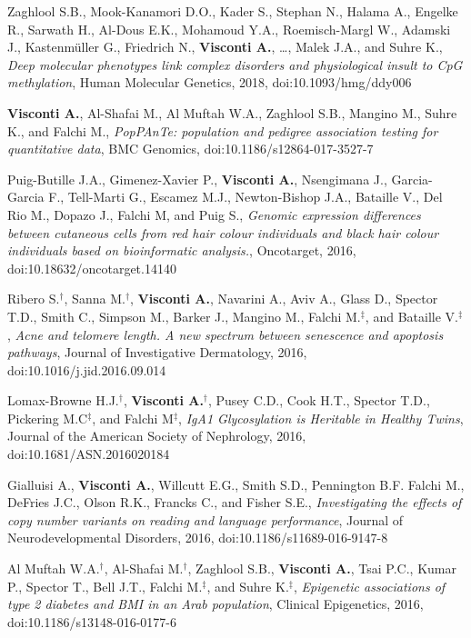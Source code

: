 {\begin{itemize}
		 Zaghlool S.B., Mook-Kanamori D.O., Kader S., Stephan N., Halama A., Engelke R., Sarwath H., Al-Dous E.K., Mohamoud Y.A., Roemisch-Margl W., Adamski J., Kastenmüller G., Friedrich N., \textbf{Visconti A.}, \dots, Malek J.A., and Suhre K., \emph{Deep molecular phenotypes link complex disorders and physiological insult to CpG methylation}, Human Molecular Genetics, 2018, doi:10.1093/hmg/ddy006
				
		 \textbf{Visconti A.}, Al-Shafai M.,  Al Muftah W.A.,  Zaghlool S.B., Mangino M., Suhre K., and Falchi M., \emph{PopPAnTe: population and pedigree association testing for quantitative data}, BMC Genomics, doi:10.1186/s12864-017-3527-7	
				
		 Puig-Butille J.A., Gimenez-Xavier P., \textbf{Visconti A.}, Nsengimana J., Garcia-Garcia F., Tell-Marti G., Escamez M.J., Newton-Bishop J.A., Bataille V., Del Rio M., Dopazo J., Falchi M, and Puig S., \emph{Genomic expression differences between cutaneous cells from red hair colour individuals and black hair colour individuals based on bioinformatic analysis.}, Oncotarget, 2016, doi:10.18632/oncotarget.14140

		 Ribero S.$^{\textbf{$\dag $}}$, Sanna M.$^{\textbf{$\dag $}}$, \textbf{Visconti A.}, Navarini A., Aviv A., Glass D., Spector T.D., Smith C., Simpson M., Barker J., Mangino M., Falchi M.$^{\textbf{$\ddag $}}$, and Bataille V.$^{\textbf{$\ddag $}}$, \emph{Acne and telomere length. A new spectrum between senescence and apoptosis pathways}, Journal of Investigative Dermatology, 2016, doi:10.1016/j.jid.2016.09.014

		 Lomax-Browne H.J.$^{\textbf{$\dag $}}$, \textbf{Visconti A.}$^{\textbf{$\dag $}}$, Pusey C.D., Cook H.T., Spector T.D., Pickering M.C$^{\textbf{$\ddag $}}$, and Falchi M$^{\textbf{$\ddag $}}$, \emph{IgA1 Glycosylation is Heritable in Healthy Twins}, Journal of the American Society of Nephrology, 2016, doi:10.1681/ASN.2016020184

		 Gialluisi A., \textbf{Visconti A.}, Willcutt E.G., Smith S.D., Pennington B.F. Falchi M., DeFries J.C.,  Olson R.K., Francks C., and Fisher S.E., \emph{Investigating the effects of copy number variants on reading and language performance}, Journal of Neurodevelopmental Disorders, 2016, doi:10.1186/s11689-016-9147-8

		 Al Muftah W.A.$^{\textbf{$\dag $}}$, Al-Shafai M.$^{\textbf{$\dag $}}$, Zaghlool S.B., \textbf{Visconti A.}, Tsai P.C., Kumar P., Spector T., Bell J.T., Falchi M.$^{\textbf{$\ddag $}}$, and Suhre K.$^{\textbf{$\ddag $}}$, \emph{Epigenetic associations of type 2 diabetes and BMI in an Arab population}, Clinical Epigenetics, 2016, doi:10.1186/s13148-016-0177-6
		

\end{itemize}}
